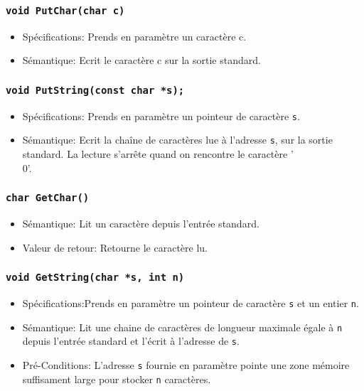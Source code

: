 \documentclass[11pt]{article}
\begin{document}
\subsubsection{\texttt{void PutChar(char c)}}
\begin{itemize}
\item[] Spécifications: Prends en paramètre un caractère c.
\item[] Sémantique: Ecrit le caractère c sur la sortie standard.
\end{itemize}

\subsubsection{\texttt{void PutString(const char *s);}}
\begin{itemize}
\item[] Spécifications: Prends en paramètre un pointeur de caractère \texttt{s}.
\item[] Sémantique:
  Ecrit la chaîne de caractères lue à l'adresse \texttt{s}, sur la sortie standard.
  La lecture s'arrête quand on rencontre le caractère '\\0'.
\end{itemize}

\subsubsection{\texttt{char GetChar()}}
\begin{itemize}
\item[] Sémantique: Lit un caractère depuis l'entrée standard.
\item[] Valeur de retour: Retourne le caractère lu.
\end{itemize}

\subsubsection{\texttt{void GetString(char *s, int n)}}
\begin{itemize}
\item[] Spécifications:Prends en paramètre un pointeur de caractère \texttt{s} et un entier \texttt{n}.
\item[] Sémantique:
  Lit une chaine de caractères de longueur maximale égale à \texttt{n} depuis l'entrée standard et
  l'écrit à l'adresse de \texttt{s}.
\item[] Pré-Conditions:
  L'adresse \texttt{s} fournie en paramètre pointe une zone mémoire suffisament large pour stocker
  \texttt{n} caractères.
\end{itemize}
\end{document}
